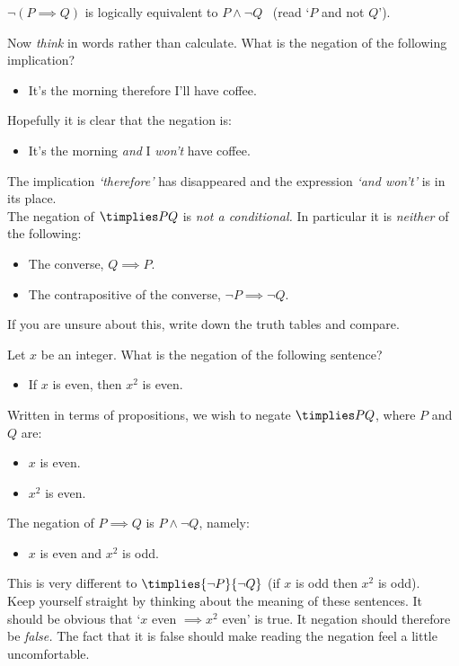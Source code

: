 \begin{thm}\label{thm:negconditional}
$\neg(P\implies Q)$ is logically equivalent to $P\wedge\neg Q$ \ (read `$P$ and not $Q$').
\end{thm}

\noindent Now \emph{think} in words rather than calculate. What is the negation of the following implication?
\begin{itemize}\setlength{\itemsep}{0pt}
  \item[] It's the morning therefore I'll have coffee.
\end{itemize}
Hopefully it is clear that the negation is:
\begin{itemize}\setlength{\itemsep}{0pt}
  \item[] It's the morning \emph{and} I \emph{won't} have coffee.
\end{itemize}

\noindent The implication \emph{`therefore'} has disappeared and the expression \emph{`and won't'} is in its place.\\

 The negation of $\timplies PQ$ is \emph{not a conditional.} In particular it is \emph{neither} of the following:
\begin{itemize}\setlength{\itemsep}{0pt}
  \item[] The converse, $Q\implies P$.
  \item[] The contrapositive of the converse, $\neg P\implies\neg Q$. 
\end{itemize}
If you are unsure about this, write down the truth tables and compare.\goodbreak

\begin{example}
Let $x$ be an integer. What is the negation of the following sentence?
\begin{itemize}\setlength{\itemsep}{0pt}
  \item[] If $x$ is even, then $x^2$ is even.
\end{itemize}
Written in terms of propositions, we wish to negate $\timplies PQ$, where $P$ and $Q$ are:
\begin{itemize}\setlength{\itemsep}{0pt}
  \item[] $x$ is even.
  \item[] $x^2$ is even.
\end{itemize}
The negation of $P\implies Q$ is $P\wedge\neg Q$, namely:
\begin{itemize}\setlength{\itemsep}{0pt}
  \item[] $x$ is even and $x^2$ is odd.
\end{itemize}
This is very different to $\timplies{\neg P}{\neg Q}$ (if $x$ is odd then $x^2$ is odd).\\[5pt]
Keep yourself straight by thinking about the meaning of these sentences. It should be obvious that `$x$ even $\implies x^2$ even' is true. It negation should therefore be \emph{false.} The fact that it is false should make reading the negation feel a little uncomfortable.
\end{example}




